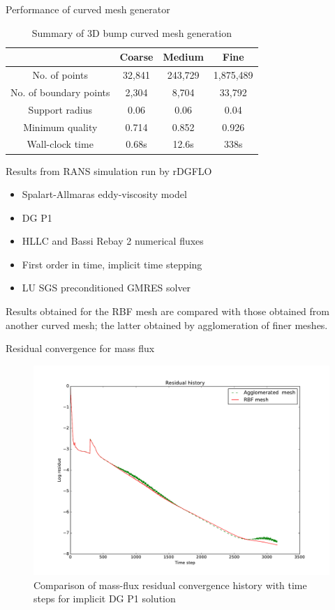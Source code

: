 \documentclass[t,12pt]{beamer}
\begin{document}
\begin{frame}{Performance of curved mesh generator}
	\begin{table}
		\centering
		\begin{tabular}{|c|c|c|c|}
			\hline
			& Coarse & Medium & Fine \\
			\hline
			No. of points 				& 32,841 & 243,729	& 1,875,489 \\
			No. of boundary points		& 2,304	& 8,704		& 33,792 \\
			Support radius				& 0.06	& 0.06		& 0.04 \\
			Minimum quality			& 0.714	& 0.852		& 0.926 \\
			Wall-clock time			& 0.68s	& 12.6s		& 338s \\
			\hline
		\end{tabular}
		\caption{Summary of 3D bump curved mesh generation}
	\end{table}
\end{frame}

\begin{frame}
Results from RANS simulation run by rDGFLO 
\begin{itemize}
	\item Spalart-Allmaras eddy-viscosity model
	\item DG P1
	\item HLLC and Bassi Rebay 2 numerical fluxes
	\item First order in time, implicit time stepping
	\item LU SGS preconditioned GMRES solver
\end{itemize}
Results obtained for the RBF mesh are compared with those obtained from another curved mesh; the latter obtained by agglomeration of finer meshes.
\end{frame}

\begin{frame}{Residual convergence for mass flux}
\begin{figure}
	\centering
	\includegraphics[scale=0.27]{solver-convergence}
	\caption{Comparison of mass-flux residual convergence history with time steps for implicit DG P1 solution}
	\label{fig:resconvergence}
\end{figure}
\end{frame}
\end{document}
